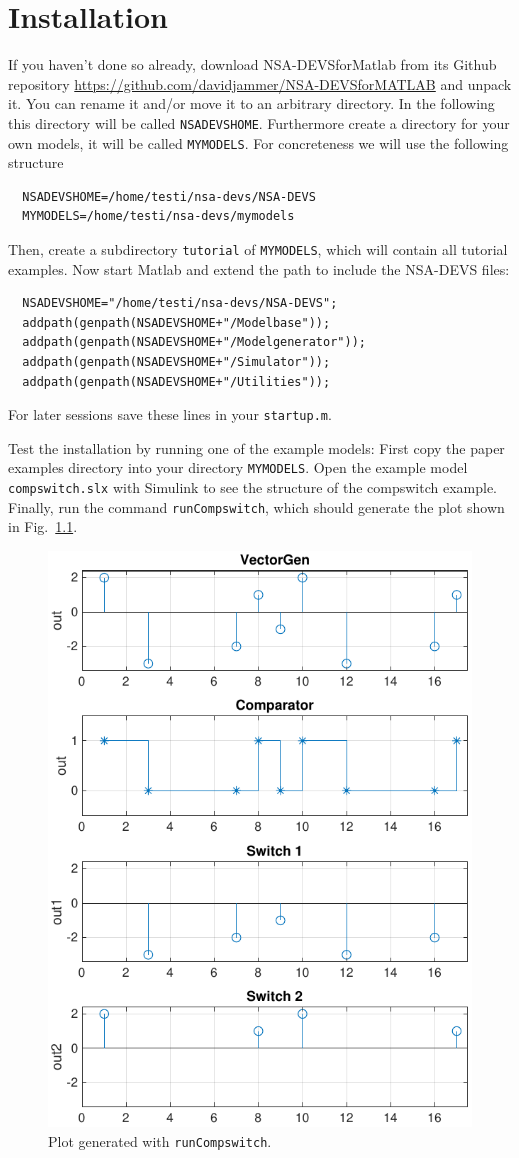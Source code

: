 \documentclass[12pt,oneside,a4paper,bibtotoc,BCOR=0pt,DIV=20]{scrreprt}
\newcommand{\cft}[1]{\mbox{\texttt{#1}}}   %
\begin{document}
\chapter{Installation}

If you haven't done so already, download NSA-DEVSforMatlab from its Github
repository \url{https://github.com/davidjammer/NSA-DEVSforMATLAB} and unpack
it. You can rename it and/or move it to an
arbitrary directory. In the
following this directory will be called \cft{NSADEVSHOME}. Furthermore create a
directory for your own models, it will be called \cft{MYMODELS}. For
concreteness we will use the following structure
\begin{Verbatim}  
  NSADEVSHOME=/home/testi/nsa-devs/NSA-DEVS
  MYMODELS=/home/testi/nsa-devs/mymodels
\end{Verbatim}
Then, create a subdirectory \cft{tutorial} of \cft{MYMODELS}, which will
contain all tutorial examples. Now start Matlab and extend the path to include
the NSA-DEVS files:
\begin{Verbatim}  
  NSADEVSHOME="/home/testi/nsa-devs/NSA-DEVS";
  addpath(genpath(NSADEVSHOME+"/Modelbase"));
  addpath(genpath(NSADEVSHOME+"/Modelgenerator"));
  addpath(genpath(NSADEVSHOME+"/Simulator"));
  addpath(genpath(NSADEVSHOME+"/Utilities"));
\end{Verbatim}
For later sessions save these lines in your \cft{startup.m}.

Test the installation by running one of the example models: First copy the
paper examples directory into your directory \cft{MYMODELS}. Open the example
model \cft{compswitch.slx} with Simulink to see the structure of the compswitch
example. Finally, run the command \cft{runCompswitch}, which should generate
the plot shown in Fig.\ \ref{fig_1}.
\begin{figure}[ht]
\centering
\includegraphics[width=0.37\columnwidth]{images/bild01.pdf}
\caption{Plot generated with \cft{runCompswitch}.}
\label{fig_1}
\end{figure}
\end{document}
